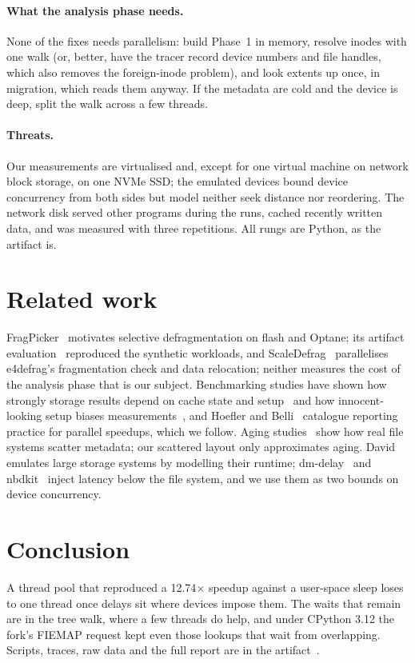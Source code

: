 \paragraph{What the analysis phase needs.} None of the fixes needs parallelism: build
Phase~1 in memory, resolve inodes with one walk (or, better, have the tracer record
device numbers and file handles, which also removes the foreign-inode problem), and look
extents up once, in migration, which reads them anyway. If the metadata are cold and
the device is deep, split the walk across a few threads.

\paragraph{Threats.} Our measurements are virtualised and, except for one virtual
machine on network block storage, on one NVMe SSD; the emulated devices bound device
concurrency from both sides but model neither seek distance nor reordering. The network
disk served other programs during the runs, cached recently written data, and was
measured with three repetitions. All rungs are Python, as the artifact is.

\section{Related work}

FragPicker~\cite{park2021fragpicker,park2023tocs} motivates selective defragmentation on
flash and Optane; its artifact evaluation~\cite{sosp21ae} reproduced the synthetic
workloads, and ScaleDefrag~\cite{lee2026scaledefrag} parallelises e4defrag's
fragmentation check and data relocation; neither measures the cost of the analysis
phase that is our subject. Benchmarking studies have shown how strongly storage results
depend on cache state and setup~\cite{traeger2008nine,tarasov2011benchmarking} and how
innocent-looking setup biases measurements~\cite{mytkowicz2009wrong}, and Hoefler and
Belli~\cite{hoefler2015scientific} catalogue reporting practice for parallel speedups,
which we follow. Aging studies~\cite{smith1997aging,conway2017aging,kadekodi2018geriatrix}
show how real file systems scatter metadata; our scattered layout only approximates
aging. David~\cite{agrawal2011david} emulates large storage systems by modelling their
runtime; dm-delay~\cite{kerneldmdelay} and nbdkit~\cite{nbdkit} inject latency below the
file system, and we use them as two bounds on device concurrency.

\section{Conclusion}

A thread pool that reproduced a 12.74$\times$ speedup against a user-space sleep loses
to one thread once delays sit where devices impose them. The waits that remain are in
the tree walk, where a few threads do help, and under CPython 3.12 the fork's FIEMAP
request kept even those lookups that wait from overlapping. Scripts, traces, raw data and
the full report are in the artifact~\cite{studybranch}.
